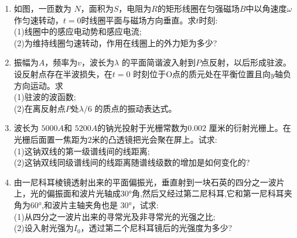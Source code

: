\begin{enumerate}
(1)导体中心轴线口点处的磁感应强度；\\
(2)空腔中任一点$P$处的磁感应强度。
\item 如图，一匝数为 $N$，面积为$ S$，电阻为$ R$的矩形线圈在匀强磁场$ B$中以角速度$\omega$作匀速转动，$t=0$时线圈平面与磁场方向垂直。求$t$时刻:\\
(1)线圈中的感应电动势和感应电流;\\
(2)为维持线圈匀速转动，作用在线圈上的外力矩为多少?
\item 振幅为$A$，频率为$v$，波长为$\lambda$ 的平面简谐波入射到$P$点反射，以后形成驻波。设反射点存在半波损失，在$t=0$ 时刻位于O点的质元处在平衡位置且向$y$轴负方向运动。求\\
(1)驻波的波函数;\\
(2)在离反射点$P$处$\lambda/6$ 的质点的振动表达式。
\item 波长为 $5000A $和 $5200A$的钠光投射于光栅常数为$ 0.002$ 厘米的衍射光栅上。在光栅后面置一焦距为2米的凸透镜把光会聚在屏上。试求:\\
(1)这钠双线的第一级谱线间的线距离;\\
(2)这钠双线同级谱线间的线距离随谱线级数的增加是如何变化的?
\item 由一尼科耳棱镜透射出来的平面偏振光，垂直射到一块石英的四分之一波片上，光的偏振面和波片光轴成30°角,然后又经过第二尼科耳,它和第一尼科耳夹角为60°,和波片主轴夹角也是 30°，试求:\\
(1)从四分之一波片出来的寻常光及非寻常光的光强之比;\\
(2)设入射光强为$I_0$，透过第二个尼科耳镜后的光强度为多少?
\end{enumerate}